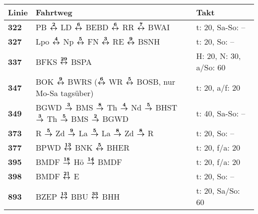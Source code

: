\begin{minipage}[t]{0.45\textwidth}
\begin{tabular}{>{\bfseries}L{1.2cm}L{9.0cm}L{3.0cm}}
{\bfseries Linie} & {\bfseries Fahrtweg} & {\bfseries Takt} \\
\hline
\bus{} 322    & PB $\boldsymbol{\overset{2}{\leftrightarrow}}$ LD $\boldsymbol{\overset{6}{\leftrightarrow}}$ BEBD $\boldsymbol{\overset{6}{\leftrightarrow}}$ RR $\boldsymbol{\overset{7}{\leftrightarrow}}$ BWAI                                                                                                  & t: 20, Sa-So: --           \\
\bus{} 327    & Lpo $\boldsymbol{\overset{4}{\leftrightarrow}}$ Np $\boldsymbol{\overset{5}{\leftrightarrow}}$ FN $\boldsymbol{\overset{3}{\leftrightarrow}}$ RE $\boldsymbol{\overset{9}{\leftrightarrow}}$ BSNH                                                                                                   & t: 20, So: --              \\
\bus{} 337    & BFKS $\boldsymbol{\overset{29}{\leftrightarrow}}$ BSPA                                                                                                                                              & H: 20, N: 30, a/So: 60     \\
\bus{} 347    & BOK $\boldsymbol{\overset{9}{\leftrightarrow}}$ BWRS ($\boldsymbol{\overset{6}{\leftrightarrow}}$ WR $\boldsymbol{\overset{5}{\leftrightarrow}}$ BOSB, nur Mo-Sa tagsüber)                                                                                          & t: 20, a/f: 20             \\
\bus{} 349    & BGWD $\boldsymbol{\overset{3}{\rightarrow}}$ BMS $\boldsymbol{\overset{8}{\rightarrow}}$ Th $\boldsymbol{\overset{4}{\rightarrow}}$ Nd $\boldsymbol{\overset{5}{\rightarrow}}$ BHST $\boldsymbol{\overset{3}{\rightarrow}}$ Th $\boldsymbol{\overset{5}{\rightarrow}}$ BMS $\boldsymbol{\overset{2}{\rightarrow}}$ BGWD                                                 & t: 40, Sa-So: --           \\
\bus{} 373    & R $\boldsymbol{\overset{5}{\rightarrow}}$ Zd $\boldsymbol{\overset{9}{\rightarrow}}$ La $\boldsymbol{\overset{5}{\rightarrow}}$ La $\boldsymbol{\overset{8}{\rightarrow}}$ Zd $\boldsymbol{\overset{8}{\rightarrow}}$ R                                                                                         & t: 20, So: --              \\
\bus{} 377    & BPWD $\boldsymbol{\overset{13}{\leftrightarrow}}$ BNK $\boldsymbol{\overset{5}{\leftrightarrow}}$ BHER                                                                                                                              & t: 20, f/a: 20             \\
\bus{} 395    & BMDF $\boldsymbol{\overset{18}{\rightarrow}}$ Hö $\boldsymbol{\overset{14}{\rightarrow}}$ BMDF                                                                                                                              & t: 20, f/a: 20             \\
\bus{} 398    & BMDF $\boldsymbol{\overset{21}{\leftrightarrow}}$ E                                                                                                                                                 & t: 20, So: --              \\
\bus{} 893    & BZEP $\boldsymbol{\overset{13}{\leftrightarrow}}$ BBU $\boldsymbol{\overset{33}{\leftrightarrow}}$ BHH                                                                                                                              & t: 20, Sa/So: 60           \\
\hline
\end{tabular}
\end{minipage}
\begin{minipage}[t]{0.05\textwidth}
\phantom{Tor}
\end{minipage}

